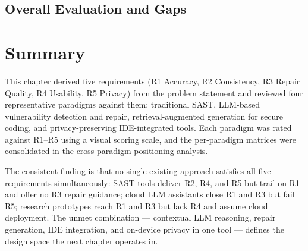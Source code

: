 \subsection{Overall Evaluation and Gaps}\vspace{-2mm}


\section{Summary}
\label{sec:analysis-summary}

This chapter derived five requirements (R1 Accuracy, R2 Consistency, R3 Repair Quality, R4 Usability, R5 Privacy) from the problem statement and reviewed four representative paradigms against them: traditional SAST, LLM-based vulnerability detection and repair, retrieval-augmented generation for secure coding, and privacy-preserving IDE-integrated tools. Each paradigm was rated against R1--R5 using a visual scoring scale, and the per-paradigm matrices were consolidated in the cross-paradigm positioning analysis.

The consistent finding is that no single existing approach satisfies all five requirements simultaneously: SAST tools deliver R2, R4, and R5 but trail on R1 and offer no R3 repair guidance; cloud LLM assistants close R1 and R3 but fail R5; research prototypes reach R1 and R3 but lack R4 and assume cloud deployment. The unmet combination --- contextual LLM reasoning, repair generation, IDE integration, and on-device privacy in one tool --- defines the design space the next chapter operates in.
